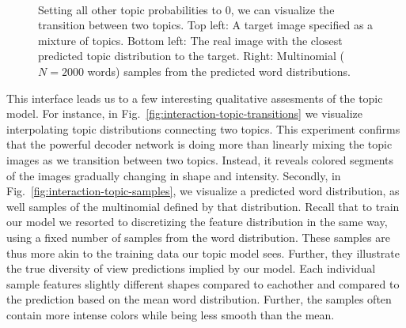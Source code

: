 \begin{figure}
    \centering
    \\
    \caption{\protect{} Setting all other topic probabilities to 0, we can visualize the transition between two topics.
             \protect{} Top left: A target image specified as a mixture of topics. Bottom left: The real image with the closest predicted topic distribution to the target. Right: Multinomial ($N=2000$ words) samples from the predicted word distributions.}
    \label{fig:interaction-insights}
\end{figure}

This interface leads us to a few interesting qualitative assesments of the topic model. For instance, in Fig.~\ref{fig:interaction-topic-transitions} we visualize interpolating topic distributions connecting two topics. This experiment confirms that the powerful decoder network is doing more than linearly mixing the topic images as we transition between two topics. Instead, it reveals colored segments of the images gradually changing in shape and intensity. Secondly, in Fig.~\ref{fig:interaction-topic-samples}, we visualize a predicted word distribution, as well samples of the multinomial defined by that distribution. Recall that to train our model we resorted to discretizing the feature distribution in the same way, using a fixed number of samples from the word distribution. These samples are thus more akin to the training data our topic model sees. Further, they illustrate the true diversity of view predictions implied by our model. Each individual sample features slightly different shapes compared to eachother and compared to the prediction based on the mean word distribution. Further, the samples often contain more intense colors while being less smooth than the mean.

